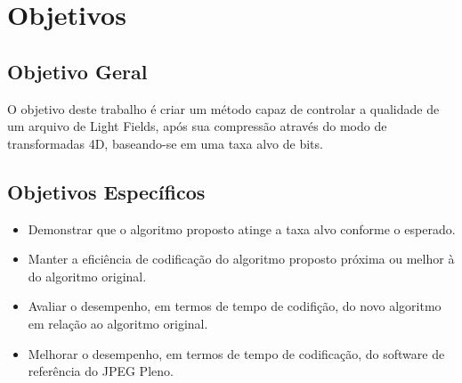 \section{Objetivos}
    \subsection{Objetivo Geral}
        O objetivo deste trabalho é criar um método capaz de controlar a qualidade de um arquivo de Light Fields, após sua compressão através do 
        modo de transformadas 4D, baseando-se em uma taxa alvo de bits.

    \subsection{Objetivos Específicos}
        \begin{itemize}
            \item Demonstrar que o algoritmo proposto atinge a taxa alvo conforme o esperado.
            \item Manter a eficiência de codificação do algoritmo proposto próxima ou melhor à do algoritmo original.
            \item Avaliar o desempenho, em termos de tempo de codifição, do novo algoritmo em relação ao algoritmo original.
            \item Melhorar o desempenho, em termos de tempo de codificação, do software de referência do JPEG Pleno.
        \end{itemize}
